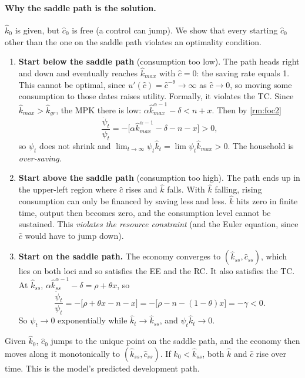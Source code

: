 \paragraph{Why the saddle path is the solution.} $\hat k_0$ is given, but $\hat c_0$ is free (a control can jump). We show that every starting $\hat c_0$ other than the one on the saddle path violates an optimality condition.
\begin{enumerate}
\item \textbf{Start below the saddle path} (consumption too low). The path heads right and down and eventually reaches $\hat k_{max}$ with $\hat c=0$: the saving rate equals 1. This cannot be optimal, since $u'(\hat c)=\hat c^{-\theta}\to\infty$ as $\hat c\to0$, so moving some consumption to those dates raises utility. Formally, it violates the TC. Since $\hat k_{max}>\hat k_{gr}$, the MPK there is low: $\alpha\hat k_{max}^{\alpha-1}-\delta<n+x$. Then by \eqref{rm:foc2}
\[
\frac{\dot\psi_t}{\psi_t}=-\big[\alpha\hat k_{max}^{\alpha-1}-\delta-n-x\big]>0,
\]
so $\psi_t$ does not shrink and $\lim_{t\to\infty}\psi_t\hat k_t=\lim\psi_t\hat k_{max}>0$. The household is \emph{over-saving}.
\item \textbf{Start above the saddle path} (consumption too high). The path ends up in the upper-left region where $\hat c$ rises and $\hat k$ falls. With $\hat k$ falling, rising consumption can only be financed by saving less and less. $\hat k$ hits zero in finite time, output then becomes zero, and the consumption level cannot be sustained. This \emph{violates the resource constraint} (and the Euler equation, since $\hat c$ would have to jump down).
\item \textbf{Start on the saddle path.} The economy converges to $(\hat k_{ss},\hat c_{ss})$, which lies on both loci and so satisfies the EE and the RC. It also satisfies the TC. At $\hat k_{ss}$, $\alpha\hat k_{ss}^{\alpha-1}-\delta=\rho+\theta x$, so
\[
\frac{\dot\psi_t}{\psi_t}=-\big[\rho+\theta x-n-x\big]=-\big[\rho-n-(1-\theta)x\big]=-\gamma<0 .
\]
So $\psi_t\to0$ exponentially while $\hat k_t\to\hat k_{ss}$, and $\psi_t\hat k_t\to0$.
\end{enumerate}
\begin{keybox}[title={Equilibrium path}]
Given $\hat k_0$, $\hat c_0$ jumps to the unique point on the saddle path, and the economy then moves along it monotonically to $(\hat k_{ss},\hat c_{ss})$. If $\hat k_0<\hat k_{ss}$, both $\hat k$ and $\hat c$ rise over time. This is the model's predicted development path.
\end{keybox}

